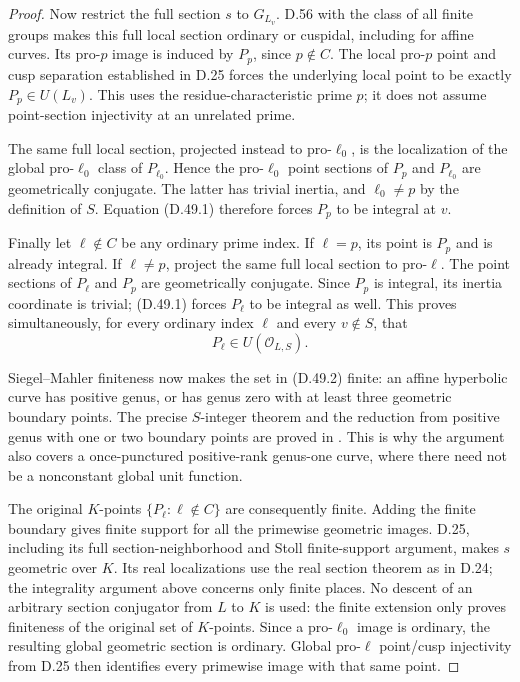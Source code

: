 \begin{proof}
Now restrict the full section
\(s\) to \(G_{L_v}\).
D.56 with the class of all
finite groups makes this full
local section ordinary or
cuspidal, including for affine curves.
Its pro-\(p\) image is induced
by \(P_p\), since \(p\notin C\).
The local pro-\(p\) point and
cusp separation established
in D.25 forces the underlying
local point to be exactly
\(P_p\in U(L_v)\). This uses
the residue-characteristic
prime \(p\); it does not
assume point-section
injectivity at an unrelated
prime.

The same full local section,
projected instead to
pro-\(\ell_0\), is the
localization of the global
pro-\(\ell_0\) class of
\(P_{\ell_0}\).
Hence the pro-\(\ell_0\)
point sections of \(P_p\)
and \(P_{\ell_0}\) are
geometrically conjugate.
The latter has trivial
inertia, and \(\ell_0\ne p\)
by the definition of \(S\).
Equation (D.49.1) therefore
forces \(P_p\) to be integral
at \(v\).

Finally let \(\ell\notin C\)
be any ordinary prime index.
If \(\ell=p\), its point
is \(P_p\) and is already
integral. If \(\ell\ne p\),
project the same full local
section to pro-\(\ell\).
The point sections of
\(P_\ell\) and \(P_p\)
are geometrically conjugate.
Since \(P_p\) is integral,
its inertia coordinate is
trivial; (D.49.1) forces
\(P_\ell\) to be integral
as well. This proves
simultaneously, for every
ordinary index \(\ell\)
and every \(v\notin S\),
that
\[
                       P_\ell\in U(\mathcal O_{L,S}).
                                                               \tag{D.49.2}
\]

Siegel--Mahler finiteness now
makes the set in (D.49.2)
finite: an affine hyperbolic
curve has positive genus, or
has genus zero with at least
three geometric boundary
points. The precise
\(S\)-integer theorem and
the reduction from positive
genus with one or two
boundary points are proved
in \cite[Theorem 1 and
\S3]{DE_CorvajaZannier2002}.
This is why the argument
also covers a once-punctured
positive-rank genus-one
curve, where there need
not be a nonconstant global
unit function.

The original \(K\)-points
\(\{P_\ell:\ell\notin C\}\)
are consequently finite.
Adding the finite boundary
gives finite support for
all the primewise geometric
images. D.25, including
its full section-neighborhood
and Stoll finite-support
argument, makes \(s\)
geometric over \(K\).
Its real localizations use
the real section theorem
as in D.24; the integrality
argument above concerns
only finite places.
No descent of an arbitrary
section conjugator from
\(L\) to \(K\) is used:
the finite extension only
proves finiteness of the
original set of \(K\)-points.
Since a pro-\(\ell_0\)
image is ordinary, the
resulting global geometric
section is ordinary.
Global pro-\(\ell\)
point/cusp injectivity from
D.25 then identifies every
primewise image with that
same point.
\end{proof}

